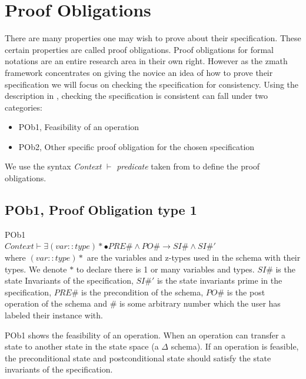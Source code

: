 \section{Proof Obligations}
\label{sec:proofobl}

There are many properties one may wish to prove about their specification. These
certain properties are called proof obligations. Proof obligations for formal
notations are an entire research area in their own right. However as the
\gls{zmath} framework concentrates on giving the novice an idea of how to prove
their specification we will focus on checking the specification for consistency.
Using the description in \cite{DBLP:conf/icsea/WenMZ06}, checking the
specification is consistent can fall under two categories:

\begin{itemize}
\item POb1, Feasibility of an operation
\item POb2, Other specific proof obligation for the chosen specification
\end{itemize}

We use the syntax \textit{Context} $\vdash$ \textit{predicate} taken from
\cite{DBLP:conf/icsea/WenMZ06} to define the proof obligations.

\subsection{POb1, Proof Obligation type 1}
\label{subsec:pob1}

\begin{defin}\label{defa}POb1\\

$Context \vdash \exists (var::type)* \bullet PRE\# \land PO\# \longrightarrow
SI\# \land SI\#'$\\

\noindent where $(var::type)*$ are the variables and z-types used in the schema
with their types. We denote $*$ to declare there is 1 or many variables and
types. $SI\#$ is the state Invariants of the specification, $SI\#'$ is the state
invariants prime in the specification, $PRE\#$ is the precondition of the
schema, $PO\#$ is the post operation of the schema and $\#$ is some arbitrary
number which the user has labeled their instance with.
\end{defin}

POb1 shows the feasibility of an operation. When an operation can transfer a
state to another state in the state space (a $\Delta$ schema). If an operation
is feasible, the preconditional state and postconditional state should satisfy
the state invariants of the specification.

